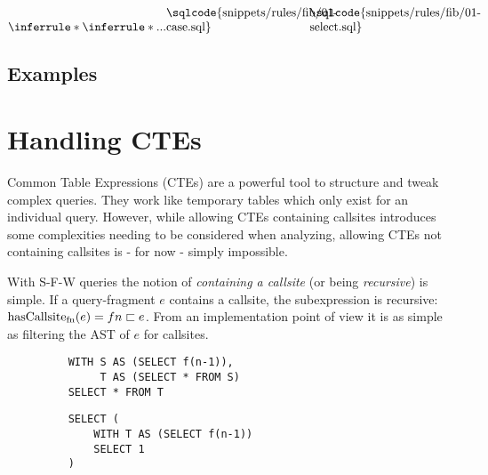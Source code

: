 

$
\inferrule*{
    \inferrule*{...}{
{\begin{minipage}[b]{12em}
\sqlcode{snippets/rules/fib/01-case.sql}
\end{minipage}}
    }
}{
{\begin{minipage}[b]{12em}
\sqlcode{snippets/rules/fib/01-select.sql}
\end{minipage}}
}
$

\fi

\subsection{Examples}


\section{Handling CTEs}

Common Table Expressions (CTEs) are a powerful tool to structure and tweak complex queries. They work like temporary tables which only exist for an individual query. However, while allowing CTEs containing callsites introduces some complexities needing to be considered when analyzing, allowing CTEs not containing callsites is - for now - simply impossible.

With S-F-W queries the notion of \textit{containing a callsite} (or being \textit{recursive}) is simple. If a query-fragment $e$ contains a callsite, the subexpression is recursive: $\operatorname{\text{hasCallsite}_{fn}}(e) = fn \sqsubset e$. From an implementation point of view it is as simple as filtering the AST of $e$ for callsites.

\begin{wrapfigure}{r}{.5\textwidth} 
    \begin{minipage}{\linewidth}
    \label{fig:simple_indiref}\par\vfill
    \begin{verbatim}
    WITH S AS (SELECT f(n-1)),
         T AS (SELECT * FROM S)
    SELECT * FROM T
    \end{verbatim}
    \label{fig:indirect_callsite}\par
    \vspace{3mm}
    \begin{verbatim}
    SELECT (
        WITH T AS (SELECT f(n-1))
        SELECT 1
    )
    \end{verbatim}
    \label{fig:unused_callsite}
\end{minipage}
\caption{}
\label{lst:indirect_callsite_ref}\vspace{-5mm} 
\end{wrapfigure}

